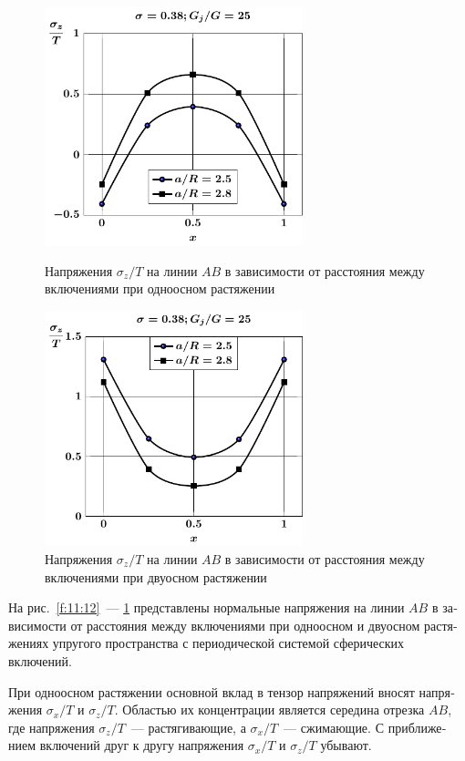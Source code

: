 \begin{russian}
\begin{figure}[h!]
\centering\footnotesize
\parbox[b]{7.5cm}{\centering\includegraphics[width=7.5cm]{periodic-spheres-inc27-a-g25-t1-sig_z.pdf}
\caption{Напряжения $\sigma_z/T$ на линии $AB$ в зависимости от расстояния между включениями при одноосном растяжении
\label{f:11:16}}}\hfil\hfil
\parbox[b]{7.5cm}{\centering\includegraphics[width=7.5cm]{periodic-spheres-inc27-a-g25-t2-sig_z.pdf}
\caption{Напряжения $\sigma_z/T$ на линии $AB$ в зависимости от расстояния между включениями при двуосном растяжении
\label{f:11:17}}}
\end{figure}

На рис.~\ref{f:11:12}~--- \ref{f:11:17} представлены нормальные напряжения на линии $AB$ в зависимости от расстояния между включениями при одноосном и двуосном растяжениях упругого пространства с периодической системой сферических включений.

При одноосном растяжении основной вклад в тензор напряжений вносят напряжения $\sigma_x/T$ и $\sigma_z/T$. Областью их концентрации является середина отрезка $AB$, где напряжения $\sigma_z/T$~--- растягивающие, а $\sigma_x/T$~--- сжимающие. С приближением включений друг к другу напряжения $\sigma_x/T$ и $\sigma_z/T$ убывают.


\end{russian}

